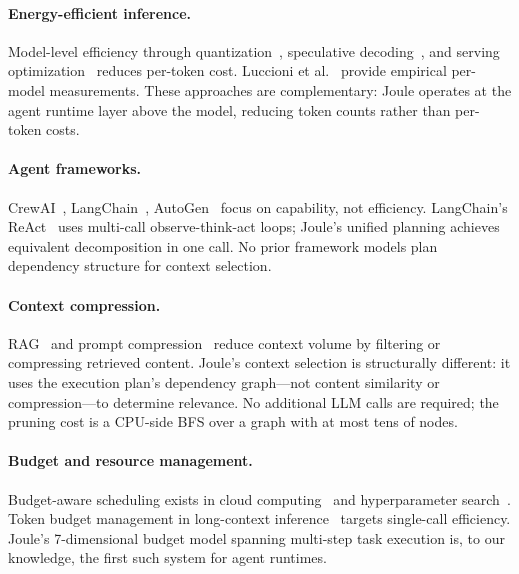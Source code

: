 \documentclass[sigconf,authordraft]{acmart}
\begin{document}
\paragraph{Energy-efficient inference.}
Model-level efficiency through quantization~\cite{dettmers2023qlora}, speculative decoding~\cite{leviathan2023fast}, and serving optimization~\cite{kwon2023efficient} reduces per-token cost.
Luccioni et al.~\cite{luccioni2023power} provide empirical per-model measurements.
These approaches are complementary: Joule operates at the agent runtime layer above the model, reducing token counts rather than per-token costs.

\paragraph{Agent frameworks.}
CrewAI~\cite{crewai}, LangChain~\cite{langchain}, AutoGen~\cite{autogen} focus on capability, not efficiency.
LangChain's ReAct~\cite{yao2022react} uses multi-call observe-think-act loops; Joule's unified planning achieves equivalent decomposition in one call.
No prior framework models plan dependency structure for context selection.

\paragraph{Context compression.}
RAG~\cite{lewis2020rag} and prompt compression~\cite{jiang2023llmlingua} reduce context volume by filtering or compressing retrieved content.
Joule's context selection is structurally different: it uses the execution plan's dependency graph---not content similarity or compression---to determine relevance.
No additional LLM calls are required; the pruning cost is a CPU-side BFS over a graph with at most tens of nodes.

\paragraph{Budget and resource management.}
Budget-aware scheduling exists in cloud computing~\cite{xiao2013dynamic} and hyperparameter search~\cite{liaw2018tune}.
Token budget management in long-context inference~\cite{shi2024context} targets single-call efficiency.
Joule's 7-dimensional budget model spanning multi-step task execution is, to our knowledge, the first such system for agent runtimes.



\end{document}
